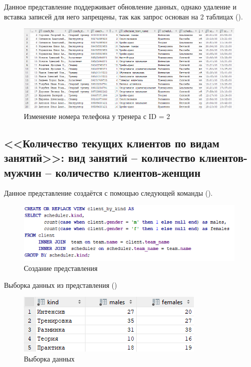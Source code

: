 \documentclass[a4paper,14pt]{article}
\begin{document}
	Данное представление поддерживает обновление данных, однако удаление и вставка записей для него запрещены, так как запрос основан на 2 таблицах ().
	
	\begin{figure}[H]
		\centering		
		\includegraphics[width=\linewidth]{image/viewResult_02}
		\caption{Изменение номера телефона у тренера с ID = 2}\label{img:viewResult_02}
	\end{figure}

\subsection{<<Количество текущих клиентов по видам занятий>>: вид занятий – количество клиентов-мужчин – количество клиентов-женщин}

	Данное представление создаётся с помощью следующей команды ().
	
	\begin{figure}[H]
		\centering		
		\includegraphics[width=0.7\linewidth]{image/viewCreate_03}
		\caption{Создание представления}\label{img:viewCreate_03}
	\end{figure}
	
	Выборка данных из представления ()
	
	\begin{figure}[H]
		\centering		
		\includegraphics[width=0.4\linewidth]{image/viewSelect_03}
		\caption{Выборка данных}\label{img:viewSelect_03}
	\end{figure}
	
\end{document}
